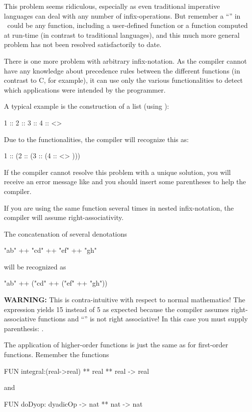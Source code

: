 This problem seems ridiculous, especially as even traditional
imperative languages can deal with any number of infix-operations.
But remember a ``\pro{+}'' in \opal\ could be any function, including a
user-defined function or a function computed at run-time (in contrast to
traditional languages), and this much more general problem has not
been resolved satisfactorily to date.
\medskip

\advanced There is one more problem with arbitrary infix-notation. 
As the compiler cannot have any knowledge about precedence rules
between the different functions (in contrast to C, for example), 
it can use only
the various functionalities to detect  which applications were
intended by the programmer. 

A typical example is the construction of a list (using
): 
\begin{prog}
          1 :: 2 :: 3 :: 4 :: <>
\end{prog}
\noindent Due to the functionalities, the compiler will recognize this as:
\begin{prog}
          1 :: (2 :: (3 :: (4 :: <> )))
\end{prog}

If the compiler cannot resolve this problem with a unique solution,
you will receive an error message like  and you should insert some parentheses to
help the compiler.

\important If you are using the same function several times in nested
infix-notation, the compiler will assume right-associativity.

\noindent The concatenation of several denotations
\begin{prog}
        "ab" ++ "cd" ++ "ef" ++ "gh"
\end{prog}
will be recognized as 
\begin{prog}
        "ab" ++ ("cd" ++ ("ef" ++ "gh"))
\end{prog}
{\bf WARNING:} This is contra-intuitive with respect to normal mathematics!
The expression 
yields 15 instead of 5 as expected because the compiler assumes
right-associative functions and ``\pro{-}'' is not right associative!
In this case you must supply parenthesis: .
\medskip

\advanced
The application of higher-order functions is just the same as for
first-order functions.
Remember the functions
\begin{prog}
        FUN integral:(real->real) ** real ** real -> real
\end{prog}
and
\begin{prog}
        FUN doDyop: dyadicOp -> nat ** nat -> nat
\end{prog}

